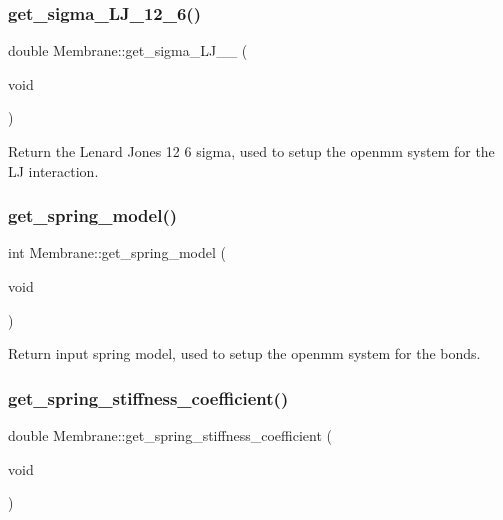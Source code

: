 \mbox{\label{classMembrane_af24a7560c8a747fc22c0f21358373334}} 
\subsubsection{\texorpdfstring{get\_sigma\_LJ\_12\_6()}{get\_sigma\_LJ\_12\_6()}}
{\footnotesize\ttfamily double Membrane\+::get\+\_\+sigma\+\_\+\+L\+J\+\_\+\_ (\begin{DoxyParamCaption}\item[{void}]{ }\end{DoxyParamCaption})\hspace{0.3cm}{\ttfamily [inline]}}

Return the Lenard Jones 12 6 sigma, used to setup the openmm system for the LJ interaction. \mbox{\label{classMembrane_aa567e00a8c4c4b4a57547b84e80e418e}} 
\subsubsection{\texorpdfstring{get\_spring\_model()}{get\_spring\_model()}}
{\footnotesize\ttfamily int Membrane\+::get\+\_\+spring\+\_\+model (\begin{DoxyParamCaption}\item[{void}]{ }\end{DoxyParamCaption})\hspace{0.3cm}{\ttfamily [inline]}}

Return input spring model, used to setup the openmm system for the bonds. \mbox{\label{classMembrane_a7076d2f0d0e1d39e74d35f6dbb193103}} 
\subsubsection{\texorpdfstring{get\_spring\_stiffness\_coefficient()}{get\_spring\_stiffness\_coefficient()}}
{\footnotesize\ttfamily double Membrane\+::get\+\_\+spring\+\_\+stiffness\+\_\+coefficient (\begin{DoxyParamCaption}\item[{void}]{ }\end{DoxyParamCaption})\hspace{0.3cm}{\ttfamily [inline]}}

